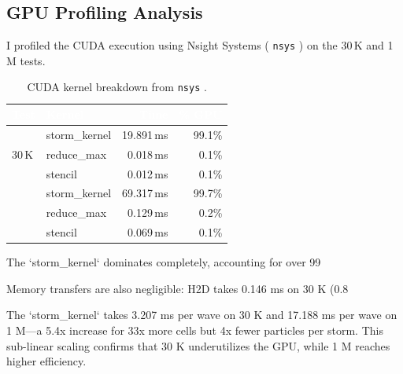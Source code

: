 \documentclass[10pt,dvipsnames,table,twocolumn]{article}
\let\oldtexttt\texttt
\renewcommand{\texttt}[1]{%
  {\small\colorbox{Mist}{\oldtexttt{\textcolor{DarkInk}{#1}}}}%
}
\begin{document}
\subsection{GPU Profiling Analysis}\label{sec:gpu-prof}

I profiled the CUDA execution using Nsight Systems (\texttt{nsys}) on the 30\,K and 1\,M tests.

\begin{table}[t]
\centering
\caption{CUDA kernel breakdown from \texttt{nsys}.}\label{tbl:nsys}
\small
\begin{tabular}{@{}llrr@{}}
\rowcolor{TableHead}
\textcolor{white}{\textbf{Test}} &
\textcolor{white}{\textbf{Kernel}} &
\textcolor{white}{\textbf{Time}} &
\textcolor{white}{\textbf{\% GPU}} \\
\midrule
\multirow{3}{*}{30\,K}
  & storm\_kernel      & 19.891\,ms & 99.1\% \\
  & reduce\_max        & 0.018\,ms  & 0.1\% \\
  & stencil            & 0.012\,ms  & 0.1\% \\
\midrule
\rowcolor{TableRowAlt}
\multirow{3}{*}{1\,M}
  & storm\_kernel      & 69.317\,ms & 99.7\% \\
\rowcolor{TableRowAlt}
  & reduce\_max        & 0.129\,ms  & 0.2\% \\
\rowcolor{TableRowAlt}
  & stencil            & 0.069\,ms  & 0.1\% \\
\bottomrule
\end{tabular}
\end{table}

The `storm_kernel` dominates completely, accounting for over 99%

Memory transfers are also negligible: H2D takes 0.146 ms on 30 K (0.8%

The `storm_kernel` takes 3.207 ms per wave on 30 K and 17.188 ms per wave on 1 M—a 5.4x increase for 33x more cells but 4x fewer particles per storm. This sub-linear scaling confirms that 30 K underutilizes the GPU, while 1 M reaches higher efficiency.
\end{document}
